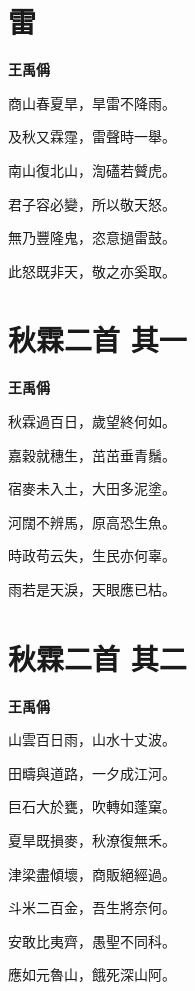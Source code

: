 \documentclass[12pt,a4paper]{ctexbook}
\begin{document}
\section{雷}
\textbf{王禹偁}\par\vspace{0.5em}
商山春夏旱，旱雷不降雨。\par
及秋又霖霪，雷聲時一舉。\par
南山復北山，渹礚若贙虎。\par
君子容必變，所以敬天怒。\par
無乃豐隆鬼，恣意撾雷鼓。\par
此怒既非天，敬之亦奚取。\par

\section{秋霖二首  其一}
\textbf{王禹偁}\par\vspace{0.5em}
秋霖過百日，歲望終何如。\par
嘉穀就穗生，茁茁垂青鬚。\par
宿麥未入土，大田多泥塗。\par
河闊不辨馬，原高恐生魚。\par
時政苟云失，生民亦何辜。\par
雨若是天淚，天眼應已枯。\par

\section{秋霖二首  其二}
\textbf{王禹偁}\par\vspace{0.5em}
山雲百日雨，山水十丈波。\par
田疇與道路，一夕成江河。\par
巨石大於甕，吹轉如蓬窠。\par
夏旱既損麥，秋潦復無禾。\par
津梁盡傾壞，商販絕經過。\par
斗米二百金，吾生將奈何。\par
安敢比夷齊，愚聖不同科。\par
應如元魯山，餓死深山阿。\par
\end{document}

